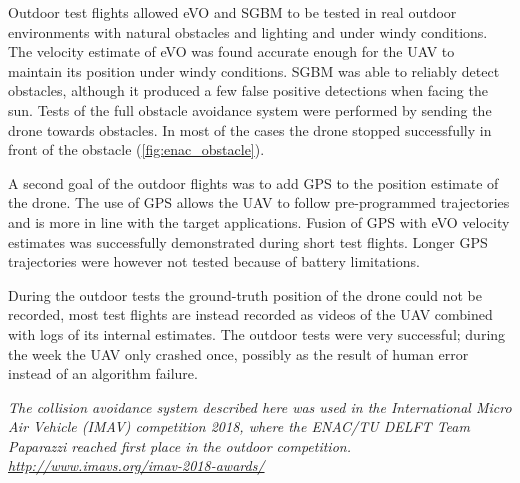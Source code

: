Outdoor test flights allowed \ac{eVO} and \acs{SGBM} to be tested in real outdoor environments with natural obstacles and lighting and under windy conditions.
The velocity estimate of \ac{eVO} was found accurate enough for the \ac{UAV} to maintain its position under windy conditions.
\acs{SGBM} was able to reliably detect obstacles, although it produced a few false positive detections when facing the sun.
Tests of the full obstacle avoidance system were performed by sending the drone towards obstacles.
In most of the cases the drone stopped successfully in front of the obstacle (\autoref{fig:enac_obstacle}).

A second goal of the outdoor flights was to add \ac{GPS} to the position estimate of the drone.
The use of \ac{GPS} allows the \ac{UAV} to follow pre-programmed trajectories and is more in line with the target applications.
Fusion of \ac{GPS} with \ac{eVO} velocity estimates was successfully demonstrated during short test flights.
Longer \ac{GPS} trajectories were however not tested because of battery limitations.

During the outdoor tests the ground-truth position of the drone could not be recorded, most test flights are instead recorded as videos of the \ac{UAV} combined with logs of its internal estimates.
The outdoor tests were very successful; during the week the \ac{UAV} only crashed once, possibly as the result of human error instead of an algorithm failure.

\medskip
\noindent
\emph{The collision avoidance system described here was used in the International Micro Air Vehicle (IMAV) competition 2018, where the ENAC/TU DELFT Team Paparazzi reached first place in the outdoor competition. \url{http://www.imavs.org/imav-2018-awards/}}


